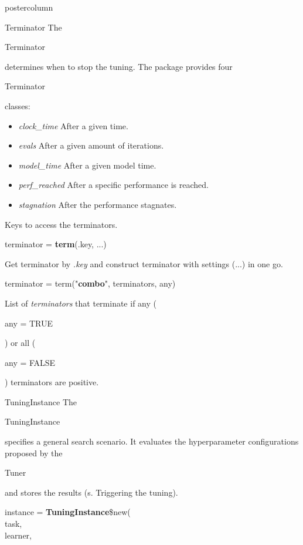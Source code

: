 \documentclass{beamer}
\newlength{\columnheight} %
\newcommand{\codeinline}[1]{\begin{codeboxinline}#1\end{codeboxinline}}
\begin{document}
\begin{frame}[fragile]{}
\begin{columns}
\begin{column}{.245\textwidth}
\begin{beamercolorbox}[center]{postercolumn}
				\begin{minipage}{.98\textwidth}
					\parbox[t][\columnheight]{\textwidth}{
						\begin{myblock}{Terminator}
							The \codeinline{Terminator} determines when to stop the tuning. The package provides four \codeinline{Terminator} classes:
							\\
							\begin{itemize}
								\item \textit{clock\_time} After a given time.
								\item \textit{evals} After a given amount of iterations.
								\item \textit{model\_time} After a given model time.
								\item \textit{perf\_reached} After a specific performance is reached.
								\item \textit{stagnation} After the performance stagnates.
							\end{itemize}
							\vspace{0.5cm}
							Keys to access the terminators.
							\\
							\begin{codebox}
								terminator = \textbf{term}(.key, ...)
							\end{codebox}
							Get terminator by \textit{.key} and construct terminator with settings (...) in one go.
							\\
							\begin{codebox}
								terminator = term("\textbf{combo}", terminators, any)
							\end{codebox}
							List of \textit{terminators} that terminate if any (\codeinline{any = TRUE}) or all (\codeinline{any = FALSE}) terminators are positive.
						\end{myblock}
						\begin{myblock}{TuningInstance}
							The \codeinline{TuningInstance} specifies a general search scenario. It evaluates the hyperparameter configurations proposed by the \codeinline{Tuner} and stores the results (s. Triggering the tuning).
							\\
							\begin{codeboxmultiline}[width=18cm]
								instance = \textbf{TuningInstance}\$new(\\
								\hspace*{1ex}task,\\
								\hspace*{1ex}learner,\\

\end{codeboxmultiline}
\end{myblock}}
\end{minipage}
\end{beamercolorbox}
\end{column}
\end{columns}
\end{frame}
\end{document}
